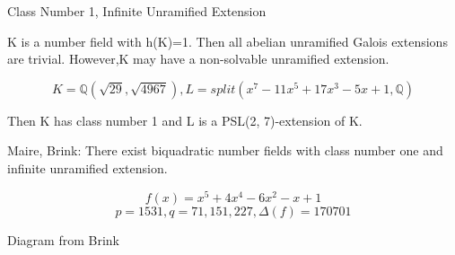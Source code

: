 \documentclass[10pt]{beamer}
\theoremstyle{plain} %
\begin{document}
\begin{frame}{Class Number 1, Infinite Unramified Extension}
\pause

K is a number field with h(K)=1. Then all abelian unramified Galois extensions are trivial. However,K may have a non-solvable unramified extension.
\pause

\begin{example}[Brink]
\begin{equation}
   K=\mathbb{Q}(\sqrt{29},\sqrt{4967}) ,
   L=split(x^7 - 11x^5 + 17x^3 - 5x + 1,\mathbb{Q})
\end{equation}

Then K has class number 1 and L is a PSL(2, 7)-extension of K.
\end{example}
\pause

Maire, Brink: There exist biquadratic number fields with class number one and infinite unramified extension.
\begin{example}
\begin{equation}
    f(x)=x^5+4x^4-6x^2-x+1
    \end{equation}
    \begin{equation}
p=1531,q=71,151,227,\Delta(f)=170701
\end{equation}
\end{example}
\end{frame}
\begin{frame}{Diagram from Brink}
    \begin{center}
\end{center}
\end{frame}
\end{document}
